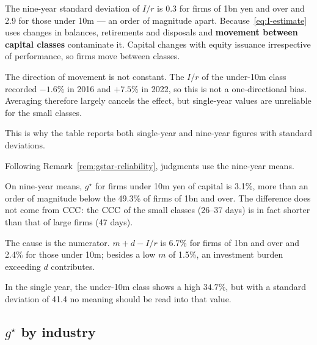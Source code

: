 \begin{remark}
\label{rem:gstar-reliability}
The nine-year standard deviation of $I/r$ is 0.3 for firms of 1bn yen and over and 2.9 for
those under 10m --- an order of magnitude apart. Because~\eqref{eq:I-estimate} uses changes in
balances, retirements and disposals and \textbf{movement between capital classes} contaminate
it. Capital changes with equity issuance irrespective of performance, so firms move between
classes.

The direction of movement is not constant. The $I/r$ of the under-10m class recorded
$-1.6\%$ in 2016 and $+7.5\%$ in 2022, so this is not a one-directional bias. Averaging
therefore largely cancels the effect, but single-year values are unreliable for the small
classes.

This is why the table reports both single-year and nine-year figures with standard
deviations.
\end{remark}

Following Remark~\ref{rem:gstar-reliability}, judgments use the nine-year means.

\begin{proposition}
\label{prop:small-margin}
On nine-year means, $g^\star$ for firms under 10m yen of capital is 3.1\%, more than an order
of magnitude below the 49.3\% of firms of 1bn and over. The difference does not come from
$\mathrm{CCC}$: the $\mathrm{CCC}$ of the small classes (26--37 days) is in fact shorter than that of large
firms (47 days).

The cause is the numerator. $m+d-I/r$ is 6.7\% for firms of 1bn and over and 2.4\% for those
under 10m; besides a low $m$ of 1.5\%, an investment burden exceeding $d$ contributes.
\end{proposition}

In the single year, the under-10m class shows a high $34.7\%$, but with a standard deviation
of 41.4 no meaning should be read into that value.

\subsection{\texorpdfstring{$g^\star$}{g*} by industry}

